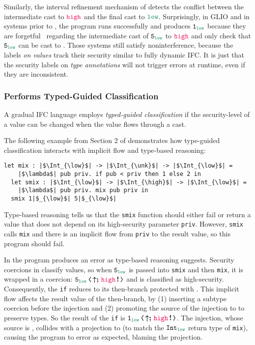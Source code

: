 Similarly, the interval refinement mechanism of \GSLRef detects the conflict
between the intermediate cast to $\high$ and the final cast to $\low$.
Surprisingly, in GLIO and in systems prior to \GSLRef \parencite{Disney:2011fv,
  Fennell:2013ab}, the program runs successfully and produces $\key{1}_{\low}$
because they are forgetful~\parencite{Greenberg:2014aa} regarding the
intermediate cast of $\key{5}_{\low}$ to $\high$ and only check that
$\key{5}_{\low}$ can be cast to \low. Those systems still satisfy
noninterference, because the labels \textit{on values} track their security
similar to fully dynamic IFC. It is just that the security labels on
\textit{type annotations} will not trigger errors at runtime, even if they are
inconsistent.

\subsubsection{\Surface Performs Typed-Guided Classification}

A gradual IFC language employs \textit{typed-guided classification} if the
security-level of a value can be changed when the value flows through a cast.

The following example from Section 2 of \textcite{Toro:2018aa} demonstrates how
type-guided classification interacts with implicit flow and type-based
reasoning:
\begin{lstlisting}[style=tt]
  let mix : |$\Int_{\low}$| -> |$\Int_{\unk}$| -> |$\Int_{\low}$| =
    |$\lambda$| pub priv. if pub < priv then 1 else 2 in
  let smix : |$\Int_{\low}$| -> |$\Int_{\high}$| -> |$\Int_{\low}$| =
    |$\lambda$| pub priv. mix pub priv in
  smix 1|$_{\low}$| 5|$_{\low}$|
\end{lstlisting}

\noindent Type-based reasoning tells us that the \texttt{smix} function should
either fail or return a value that does not depend on its high-security
parameter \texttt{priv}. However, \texttt{smix} calls \texttt{mix} and there is
an implicit flow from \texttt{priv} to the result value, so this program should
fail.

In \Surface the program produces an error as type-based reasoning suggests.
Security coercions in \CC classify values, so when $\key{5}_{\low}$ is passed
into \texttt{smix} and then \texttt{mix}, it is wrapped in a coercion:
$\cccast{\key{5}_{\low}}{\up\seq\inj{\high}}$ and is classified as
high-security.
%
Consequently, the \texttt{if} reduces to its then-branch protected with \high.
This implicit flow affects the result value of the then-branch, by (1) inserting
a subtype coercion before the injection and (2) promoting the source of the
injection to \high to preserve types. So the result of the \texttt{if} is
$\cccast{\key{1}_{\low}}{\up\seq\inj{\high}}$. The injection, whose source is
\high, collides with a projection to \low (to match the $\Int_{\low}$ return
type of \texttt{mix}), causing the program to error as expected, blaming the
projection.

